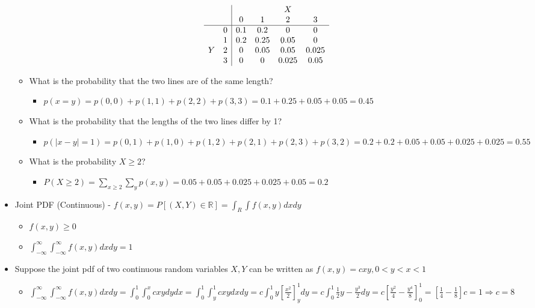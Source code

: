 \documentclass{article}
\begin{document}
\begin{itemize}
\[\begin{array}{cc|cccc}
         & & & & X & \\
         & & 0 & 1 & 2 & 3 \\
        \hline
         & 0 & 0.1 & 0.2 & 0 & 0 \\
         & 1 & 0.2 & 0.25 & 0.05 & 0 \\
        Y & 2 & 0 & 0.05 & 0.05 & 0.025 \\
         & 3 & 0 & 0 & 0.025 & 0.05 
    \end{array}\]
    \begin{itemize}
        \item What is the probability that the two lines are of the same length?
        \begin{itemize}
            \item $p(x=y)=p(0,0)+p(1,1)+p(2,2)+p(3,3) = 0.1 + 0.25 + 0.05 + 0.05 = 0.45$
        \end{itemize}
        \item What is the probability that the lengths of the two lines differ by 1?
        \begin{itemize}
            \item $p(\vert x - y \vert = 1)=p(0,1)+p(1,0)+p(1,2)+p(2,1)+p(2,3)+p(3,2) = 0.2 + 0.2 + 0.05 + 0.05 + 0.025 + 0.025 = 0.55$
        \end{itemize}
        \item What is the probability $X \ge 2$?
        \begin{itemize}
            \item $P(X \ge 2) = \sum_{x \ge 2} \sum_y p(x,y) = 0.05+0.05+0.025+0.025+0.05 = 0.2$
        \end{itemize}
    \end{itemize}
    \item Joint PDF (Continuous) - $f(x,y) = P[(X,Y) \in \mathbb{R}]  = \int_R \int f(x,y) dxdy$
    \begin{itemize}
        \item $f(x,y) \ge 0$
        \item $\int_{-\infty}^\infty \int_{-\infty} ^\infty f(x,y) dxdy = 1$
    \end{itemize}
    \item Suppose the joint pdf of two continuous random variables $X,Y$ can be written as $f(x,y)=cxy, 0 < y < x < 1$
    \begin{itemize}
        \item $\int_{-\infty}^\infty \int_{-\infty} ^\infty f(x,y) dxdy =  \int_0^1 \int_0^x cxydydx = \int_0^1 \int_y^1 cxy dxdy = c \int_0^1 y[\frac{x^2}{2}]_y^1 dy = c \int_0^1 \frac{1}{2} y - \frac{y^3}{2} dy = c [\frac{y^2}{4} - \frac{y^4}{8}]_0^1 = [\frac{1}{4}-\frac{1}{8}] c = 1 \Rightarrow c = 8$

\end{itemize}
\end{itemize}
\end{document}
